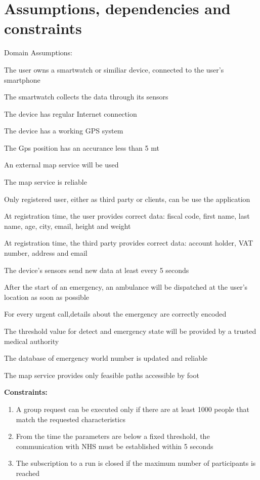 \section{Assumptions, dependencies and constraints}
Domain Assumptions:
\begin{enumerate}[label={[}D.\arabic*{]}]

\item \label{d:1}
The user owns a smartwatch or similiar device, connected to the user’s smartphone
\item\label{d:2}
The smartwatch collects the data through its sensors
\item\label{d:3}
The device has regular Internet connection 
\item\label{d:4}
The device has a working GPS system 
\item\label{d:4}
The Gps position has an accurance less than 5 mt
\item\label{d:5}
An external map service will be used
\item\label{d:6}
The map service is reliable
\item\label{d:7}
Only registered user, either as third party or clients, can be use the application
\item\label{d:8}
At registration time, the user provides correct data: fiscal code, first name, last name, age, city, email, height and weight
\item\label{d:08}
At registration time, the third party provides correct data: account holder, VAT number, address and email
\item\label{d:9}
The device’s sensors send new data at least every 5 seconds
\item\label{d:10}
After the start of an emergency, an ambulance will be dispatched at the user’s location as soon as possible
\item\label{d:11}
For every urgent call,details about the emergency are correctly encoded
\item\label{d:12}
The threshold value for detect and emergency state will be provided by a trusted medical authority
\item\label{d:13}
The database of emergency world number is updated and reliable
\item\label{d:14}
The map service provides only feasible paths accessible by foot
\end{enumerate}

\textbf{Constraints:}

\begin{enumerate}
    \item\label{c:1}	A group request can be executed only if there are at least 1000 people that match the requested characteristics 
    \item\label{c:2}
    From the time the parameters are below a fixed threshold, the communication with NHS must be established within 5 seconds
    \item\label{c:3}
    The subscription to a run is closed if the maximum number of participants is reached
\end{enumerate}



